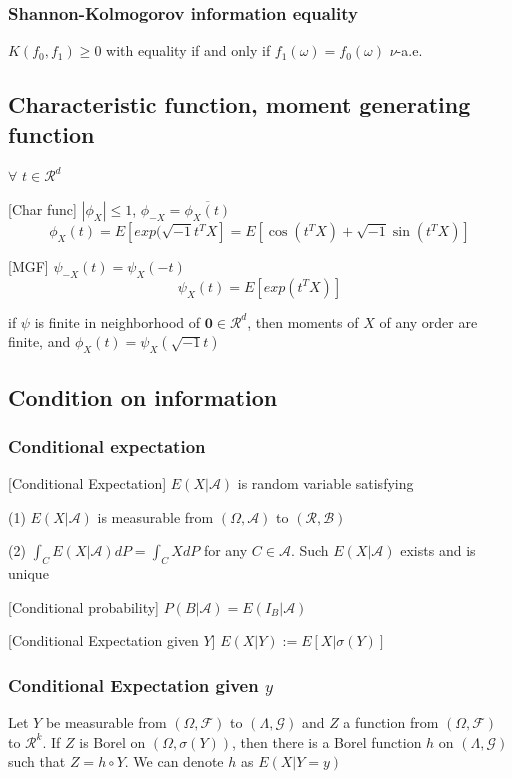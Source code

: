 \subsubsection{Shannon-Kolmogorov information equality}

$K(f_0, f_1)\geq 0$ with equality if and only if $f_1(\omega)=f_0(\omega)$ $\nu$-a.e.

\subsection{Characteristic function, moment generating function}
$\forall$ $t\in\mathcal{R}^d$

[Char func] $|\phi_X|\leq 1$, $\phi_{-X}=\overline{\phi_X(t)}$
$$
\phi_X(t) = E\left[exp(\sqrt{-1}t^TX\right]=E\left[\cos(t^TX) + \sqrt{-1}\sin(t^TX)\right]
$$

[MGF] $\psi_{-X}(t) = \psi_{X}(-t)$
$$
\psi_X(t) = E\left[exp(t^TX)\right]
$$

if $\psi$ is finite in neighborhood of $\mathbf{0}\in\mathcal{R}^d$, then moments of $X$ of any order are finite, and $\phi_X(t)=\psi_X(\sqrt{-1}t)$

\subsection{Condition on information}

\subsubsection{Conditional expectation}
[Conditional Expectation]
$E(X|\mathcal{A})$ is random variable satisfying

(1) $E(X|\mathcal{A})$ is measurable from $(\Omega, \mathcal{A})$ to $(\mathcal{R}, \mathcal{B})$

(2) $\int_C E(X|\mathcal{A})dP=\int_C X dP$ for any $C\in \mathcal{A}$.
Such $E(X|\mathcal{A})$ exists and is unique

[Conditional probability]
$P(B|\mathcal{A})=E(I_B|\mathcal{A})$

[Conditional Expectation given $Y$]
$E(X|Y):=E[X|\sigma(Y)]$

\subsubsection{Conditional Expectation given $y$}
Let $Y$ be measurable from $(\Omega, \mathcal{F})$ to $(\Lambda, \mathcal{G})$ and $Z$ a function from $(\Omega, \mathcal{F})$ to $\mathcal{R}^k$. If $Z$ is Borel on $(\Omega, \sigma(Y))$, then there is a Borel function $h$ on $(\Lambda, \mathcal{G})$ such that $Z=h\circ Y$. We can denote $h$ as $E(X|Y=y)$

